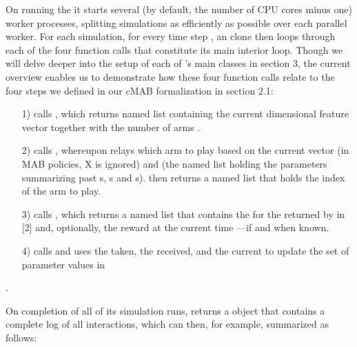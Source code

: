 \documentclass{jss}\usepackage[]{graphicx}\usepackage[]{color}
\begin{document}
On running the  it starts several (by default, the number of CPU cores minus one) worker processes, splitting simulations as efficiently as possible over each parallel worker. For each simulation, for every time step , an  clone then loops through each of the four function calls that constitute its main interior loop. Though we will delve deeper into the setup of each of 's main classes in section 3, the current overview enables us to demonstrate how these four function calls relate to the four steps we defined in our cMAB formalization in section 2.1:

\begin{enumerate}
         \item[1)]  calls , which returns named list  containing the current  dimensional  feature vector  together with the number of arms .
         \item[2)]  calls , whereupon  relays which arm to play based on the current  vector  (in MAB policies, X is ignored) and  (the named list holding the parameters summarizing past s, s and s).  then returns a named list  that holds the index of the arm to play.
         \item[3)]  calls , which returns a named list  that contains the  for the  returned by  in [2] and, optionally, the  reward at the current time ---if and when known.
         \item[4)]  calls  and uses the  taken, the  received, and the current  to update the set of parameter values in 
\end{enumerate}.

On completion of all of its simulation runs,  returns a  object that contains a complete log of all interactions, which can then, for example, summarized as follows:
\end{document}
